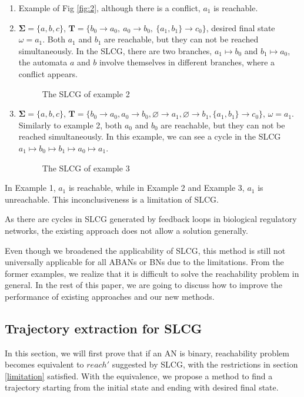 \documentclass[runningheads]{llncs}
\newcommand{\acm}[3]{#1\rightarrow#2}
\begin{document}
\begin{enumerate}
\item Example of %
Fig \ref{fig:2}, although there is a conflict, $a_1$ is reachable.
\item $\mathbf{\Sigma}=\{a,b,c\}$, $\mathbf{T}=\{\acm{b_0}{a_0}{a_1},\ \acm{a_0}{b_0}{b_1},\ \acm{\{a_1,b_1\}}{c_0}{c_1}\}$,  desired final state $\omega=a_1$. 
Both $a_1$ and $b_1$ are reachable, but they can not be reached simultaneously.
In the SLCG, there are two branches, $a_1\mapsto b_0$ and $b_1\mapsto a_0$, the automata $a$ and $b$ involve themselves in different branches, where a conflict appears.
\begin{figure}[ht]
\centering

\caption{The SLCG of example 2}
\label{fig:3}
\end{figure}
\item $\mathbf{\Sigma}=\{a,b,c\}$, $\mathbf{T}=\{\acm{b_0}{a_0}{a_1},\acm{a_0}{b_0}{b_1},\acm{\varnothing}{a_1}{a_0}, \acm{\varnothing}{b_1}{b_0},\acm{\{a_1,b_1\}}{c_0}{c_1}\}$, $\omega=a_1$. 
Similarly to example 2, both $a_0$ and $b_0$ are reachable, but they can not be reached simultaneously. 
In this example, we can see a cycle in the SLCG $a_1\mapsto b_0\mapsto b_1 \mapsto a_0\mapsto a_1$.
\begin{figure}[ht]
\centering

\caption{The SLCG of example 3}
\label{fig:4}
\end{figure}

\end{enumerate}

In Example 1, $a_1$ is reachable, while in Example 2 and Example 3, $a_1$ is unreachable. This inconclusiveness is a limitation of SLCG.

As there are cycles in SLCG generated by feedback loops in biological regulatory networks, the existing approach does not allow a solution generally.

Even though we broadened the applicability of SLCG, this method is still not universally applicable for all ABANs or BNs due to the limitations. From the former examples, we realize that it is difficult to solve the reachability problem in general. 
In the rest of this paper, we are going to discuss how to improve the performance of existing approaches and our new methods. 

\subsection{Trajectory extraction for SLCG}\label{sectExtract}
In this section, we will first prove that if an AN is binary, reachability problem becomes equivalent to $reach'$ suggested by SLCG, with the restrictions in section \ref{limitation} satisfied. 
With the equivalence, we propose a method to find a trajectory starting from the initial state and ending with desired final state.
\end{document}
